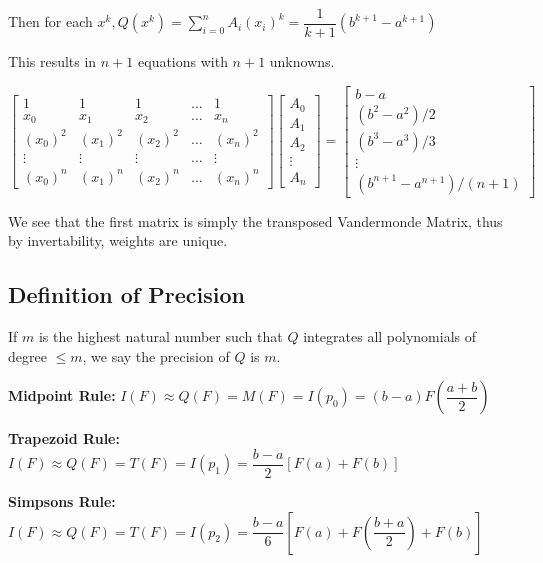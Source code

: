 \documentclass{article}
\begin{document}
Then for each $x^k, Q(x^k) = \displaystyle \sum_{i = 0}^n A_i (x_i)^k = \dfrac{1}{k + 1} (b^{k + 1} - a^{k + 1})$

This results in $n + 1$ equations with $n + 1$ unknowns.

\vspace{0.2cm}

$\begin{bmatrix}
1 & 1 & 1 & \dots & 1\\
x_0 & x_1 & x_2 & \dots & x_n\\
(x_0)^2 & (x_1)^2 & (x_2)^2 & \dots & (x_n)^2\\
 \vdots & \vdots & \vdots & \hdots & \vdots\\
(x_0)^n & (x_1)^n & (x_2)^n & \dots & (x_n)^n 
\end{bmatrix} \begin{bmatrix}
A_0\\
A_1\\
A_2\\
\vdots\\
A_n
\end{bmatrix} = \begin{bmatrix}
b - a\\
(b^2 - a^2)/2\\
(b^3 - a^3)/3\\
\vdots\\
(b^{n + 1} - a^{n + 1})/(n + 1)
\end{bmatrix}$

\vspace{0.2cm}

We see that the first matrix is simply the transposed Vandermonde Matrix, thus by invertability, weights are unique.

\subsection{Definition of Precision}

If $m$ is the highest natural number such that $Q$ integrates all polynomials of degree $\leq m$, we say the precision of $Q$ is $m$.

\vspace{0.2cm}

\textbf{Midpoint Rule:} $I(F) \approx Q(F) = M(F) = I(p_0) = (b-a) F(\dfrac{a + b}{2})$

\textbf{Trapezoid Rule:} $I(F) \approx Q(F) = T(F) = I(p_1) = \dfrac{b - a}{2} [F(a) + F(b)]$

\textbf{Simpsons Rule:} $I(F) \approx Q(F) = T(F) = I(p_2) = \dfrac{b - a}{6} [F(a) + F(\dfrac{b + a}{2}) + F(b)]$
\end{document}
